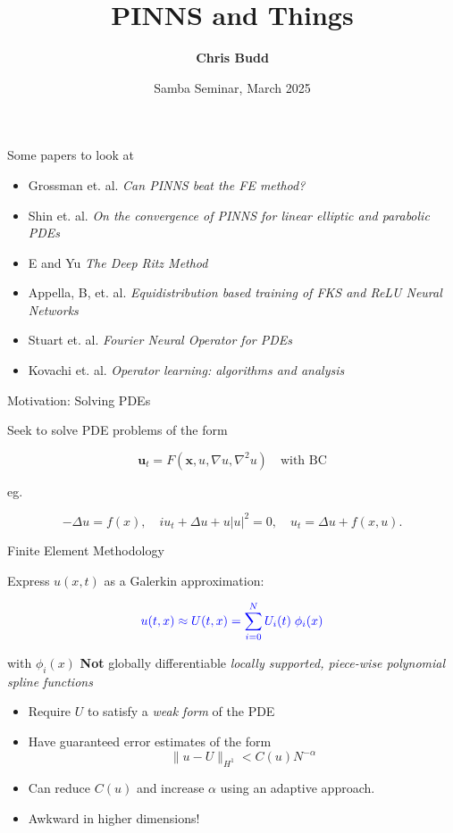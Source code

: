 \documentclass{beamer}
\title[PINNS and Things]{PINNS and Things}
\author[Chris Budd]{  {\bf Chris Budd\inst{1}}  }
\institute[Bath]{{\inst{1} University of Bath   }}
\date{Samba Seminar, March 2025}
\begin{document}

\begin{frame}
\titlepage
\end{frame}


\begin{frame}{Some papers to look at}

\begin{itemize}
\item Grossman et. al. {\em Can PINNS beat the FE method?}
\item Shin et. al. {\em On the convergence of PINNS for linear elliptic and parabolic PDEs}
\item E and Yu {\em The Deep Ritz Method}
\item Appella, B, et. al. {\em Equidistribution based training of FKS and ReLU Neural Networks}
\item  Stuart et. al. {\em Fourier Neural Operator for PDEs}
\item Kovachi et. al. {\em Operator learning: algorithms and analysis}
\end{itemize}

\end{frame}

\begin{frame}{Motivation: Solving PDEs}
    

Seek to solve PDE problems of the form

\vspace{0.2in}

{\color{red} $${\mathbf u}_t =  F({\mathbf x}, u, \nabla u, \nabla^2 u) \quad \mbox{with BC}$$}

eg.

{\color{blue} 
$$-\Delta u = f(x), \quad i u_t + \Delta u + u|u|^2 = 0, \quad u_t = \Delta u + f(x,u).$$
}

\end{frame}

\begin{frame}{Finite Element Methodology}


Express $u(x,t)$ as a Galerkin approximation:

$${\color{blue} u(t,x) \approx U(t,x) =  \sum_{i=0}^N  U_i(t) \; \phi_i(x)}$$

with $\phi_i(x)$  {\color{red} {\bf Not} globally differentiable {\em locally supported, piece-wise polynomial spline functions}}  


\begin{itemize}

\item Require $U$ to satisfy a {\em weak form} of the PDE
\item Have guaranteed error estimates of the form 
$$\|u - U \|_{H^1} < C(u) N^{-\alpha}$$
\item Can reduce $C(u)$ and increase $\alpha$ using an adaptive approach. 
\item Awkward in higher dimensions!
\end{itemize}

\end{frame}
\end{document}
